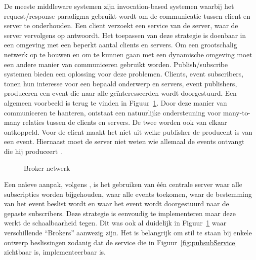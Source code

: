 De meeste middleware systemen zijn invocation-based systemen waarbij het request/response paradigma gebruikt wordt om de communicatie tussen client en server te onderhouden.
Een client verzoekt een service van de server, waar de server vervolgens op antwoordt.
Het toepassen van deze strategie is doenbaar in een omgeving met een beperkt aantal clients en servers.
Om een grootschalig netwerk op te bouwen en om te kunnen gaan met een dynamische omgeving moet een andere manier van communiceren gebruikt worden.
Publish/subscribe systemen bieden een oplossing voor deze problemen.
Clients, event subscribers, tonen hun interesse voor een bepaald onderwerp en servers, event publishers, produceren een event die naar alle geïnteresseerden wordt doorgestuurd.
Een algemeen voorbeeld is terug te vinden in Figuur~\ref{fig:pubsubArchi}.
Door deze manier van communiceren te hanteren, ontstaat een natuurlijke ondersteuning voor many-to-many relaties tussen de clients en servers.
De twee worden ook van elkaar ontkoppeld.
Voor de client maakt het niet uit welke publisher de producent is van een event.
Hiernaast moet de server niet weten wie allemaal de events ontvangt die hij produceert \citep{pietzuch2002hermes}.

\begin{figure}[!ht]
\centering
{}
\caption{Broker netwerk \citep{pietzuch2002hermes}}
\label{fig:pubsubArchi}
\end{figure}

Een naïeve aanpak, volgens \citet{carzaniga2001design}, is het gebruiken van één centrale server waar alle subscripties worden bijgehouden, waar alle events toekomen, waar de bestemming van het event beslist wordt en waar het event wordt doorgestuurd naar de gepaste subscribers.
Deze strategie is eenvoudig te implementeren maar deze werkt de schaalbaarheid tegen.
Dit was ook al duidelijk in Figuur~\ref{fig:pubsubArchi} waar verschillende ``Brokers'' aanwezig zijn.
Het is belangrijk om stil te staan bij enkele ontwerp beslissingen zodanig dat de service die in Figuur~\ref{fig:pubsubService} zichtbaar is, implementeerbaar is.


